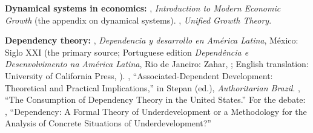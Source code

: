 \documentclass[../structural_economics_book.tex]{subfiles}
\begin{document}
\textbf{Dynamical systems in economics:} \citet{acemoglu2009introduction}, \textit{Introduction to Modern Economic Growth} (the appendix on dynamical systems). \citet{galor2011unified}, \textit{Unified Growth Theory}.

\textbf{Dependency theory:} \citet{cardoso1969dependencia}, \textit{Dependencia y desarrollo en Am\'{e}rica Latina}, M\'{e}xico: Siglo XXI (the primary source; Portuguese edition \textit{Depend\^{e}ncia e Desenvolvimento na Am\'{e}rica Latina}, Rio de Janeiro: Zahar, \citeyear{cardoso1970dependencia}; English translation: University of California Press, \citeyear{cardoso1979dependency}).
\citet{cardoso1973associated}, ``Associated-Dependent Development: Theoretical and Practical Implications,'' in Stepan (ed.), \textit{Authoritarian Brazil}. \citet{cardoso1977consumption}, ``The Consumption of Dependency Theory in the United States.'' For the debate: \citet{palma1978dependency}, ``Dependency: A Formal Theory of Underdevelopment or a Methodology for the Analysis of Concrete Situations of Underdevelopment?''
\end{document}
